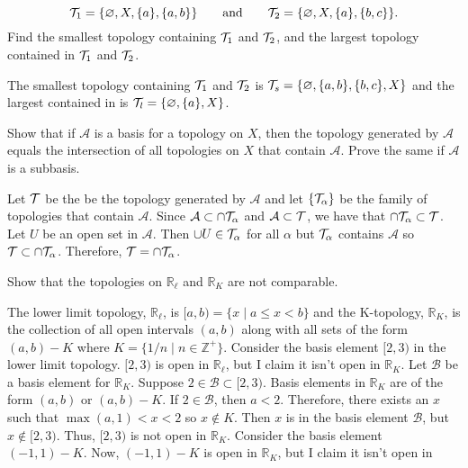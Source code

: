 \begin{exercise}
\begin{exercise}[label = (\alph*)]
\[    \mathcal{T}_1 = \{\varnothing, X, \{a\}, \{a, b\}\}\qquad\text{and}\qquad
    \mathcal{T}_2 = \{\varnothing, X, \{a\}, \{b, c\}\}.
    \]
    Find the smallest topology containing \(\mathcal{T}_1\) and \(\mathcal{T}_2\), and the
    largest topology contained in \(\mathcal{T}_1\) and \(\mathcal{T}_2\).
    \par\smallskip
    The smallest topology containing \(\mathcal{T}_1\) and \(\mathcal{T}_2\) is
    \(\mathcal{T}_s = \{\varnothing,\{a,b\},\{b,c\},X\}\) and the largest contained in
    is
    \(\mathcal{T}_l = \{\varnothing,\{a\},X\}\).
  \end{exercise}
\item
  Show that if \(\mathcal{A}\) is a basis for a topology on \(X\), then the
  topology generated by \(\mathcal{A}\) equals the intersection of all
  topologies on \(X\) that contain \(\mathcal{A}\).
  Prove the same if \(\mathcal{A}\) is a subbasis.
  \par\smallskip
  Let \(\mathcal{T}\) be the be the topology generated by \(\mathcal{A}\) and let
  \(\{\mathcal{T}_{\alpha}\}\) be the family of topologies that contain
  \(\mathcal{A}\).
  Since \(\mathcal{A}\subset\cap\mathcal{T}_{\alpha}\) and
  \(\mathcal{A}\subset\mathcal{T}\), we have that \(\cap\mathcal{T}_{\alpha}\subset\mathcal{T}\).
  Let \(U\) be an open set in \(\mathcal{A}\).
  Then \(\cup U\in\mathcal{T}_{\alpha}\) for all \(\alpha\) but \(\mathcal{T}_{\alpha}\)
  contains \(\mathcal{A}\) so \(\mathcal{T}\subset\cap\mathcal{T}_{\alpha}\).
  Therefore, \(\mathcal{T} = \cap\mathcal{T}_{\alpha}\).
\item
  Show that the topologies on \(\mathbb{R}_{\ell}\) and \(\mathbb{R}_K\) are
  not comparable.
  \par\smallskip
  The lower limit topology, \(\mathbb{R}_{\ell}\), is
  \([a,b) = \{x\mid a\leq x < b\}\) and the K-topology, \(\mathbb{R}_K\),
  is the collection of all open intervals \((a,b)\) along with all sets of the
  form \((a,b) - K\) where \(K = \{1/n\mid n\in\mathbb{Z}^+\}\).
  Consider the basis element \([2,3)\) in the lower limit topology.
  \([2,3)\) is open in \(\mathbb{R}_{\ell}\), but I claim it isn't open in
  \(\mathbb{R}_K\).
  Let \(\mathcal{B}\) be a basis element for \(\mathbb{R}_K\).
  Suppose \(2\in\mathcal{B}\subset [2,3)\).
  Basis elements in \(\mathbb{R}_K\) are of the form \((a,b)\) or
  \((a,b) - K\).
  If \(2\in\mathcal{B}\), then \(a < 2\).
  Therefore, there exists an \(x\) such that \(\max(a,1) < x < 2\) so
  \(x\not\in K\).
  Then \(x\) is in the basis element \(\mathcal{B}\), but \(x\not\in [2,3)\).
  Thus, \([2,3)\) is not open in \(\mathbb{R}_K\).
  Consider the basis element \((-1,1) - K\).
  Now, \((-1,1) - K\) is open in \(\mathbb{R}_K\), but I claim it isn't open in

\end{exercise}
